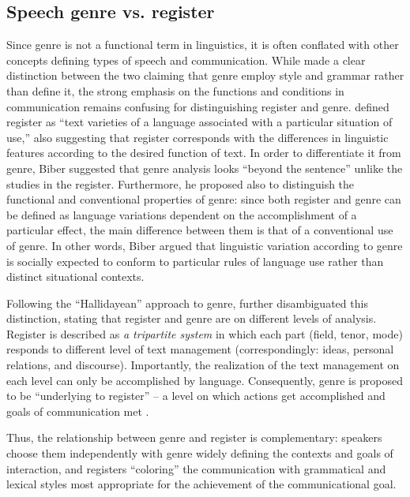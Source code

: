 \documentclass[12pt]{article}
\begin{document}
\subsection{Speech genre vs. register}
Since genre is not a functional term in linguistics, it is often conflated with other concepts defining types of speech and communication. While \textcite{bakhtin1986} made a clear distinction between the two claiming that genre employ style and grammar rather than define it, the strong emphasis on the functions and conditions in communication remains confusing for distinguishing register and genre. \textcite[p. 191]{biber2012} defined register as ``text varieties of a language associated with a particular situation of use,'' also suggesting that register corresponds with the differences in linguistic features according to the desired function of text. In order to differentiate it from genre, Biber suggested that genre analysis looks ``beyond the sentence'' unlike the studies in the register. Furthermore, he proposed also to distinguish the functional and conventional properties of genre: since both register and genre can be defined as language variations dependent on the accomplishment of a particular effect, the main difference between them is that of a conventional use of genre. In other words, Biber argued that linguistic variation according to genre is socially expected to conform to particular rules of language use rather than distinct situational contexts. 

Following the ``Hallidayean'' approach to genre, \textcite{swales1990} further disambiguated this distinction, stating that register and genre are on different levels of analysis. Register is described as \textit{a tripartite system} in which each part (field, tenor, mode) responds to different level of text management (correspondingly: ideas, personal relations, and discourse). Importantly, the realization of the text management on each level can only be accomplished by language. Consequently, genre is proposed to be ``underlying to register'' -- a level on which actions get accomplished and goals of communication met \parencite[p. 40]{swales1990}. 

Thus, the relationship between genre and register is complementary: speakers choose them independently with genre widely defining the contexts and goals of interaction, and registers ``coloring'' the communication with grammatical and lexical styles most appropriate for the achievement of the communicational goal. 
\end{document}
